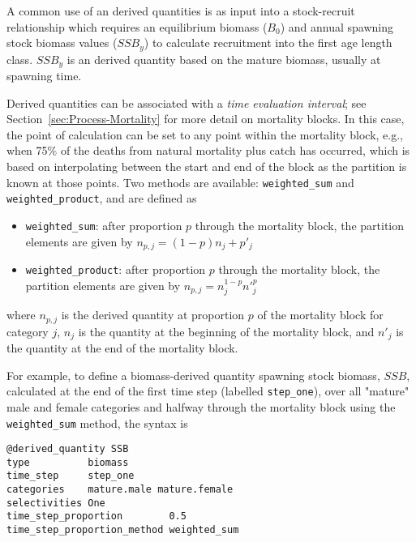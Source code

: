 A common use of an derived quantities is as input into a stock-recruit relationship  which requires an equilibrium biomass ($B_0$) and annual spawning stock biomass values ($SSB_y$) to calculate recruitment into the first \ifAgeBased age \else length \fi class. $SSB_y$ is an derived quantity based on the mature biomass, usually at spawning time.

Derived quantities can be associated with a \textit{time evaluation interval}; see Section~\ref{sec:Process-Mortality} for more detail on mortality blocks. In this case, the point of calculation can be set to any point within the mortality block, e.g., when 75\% of the deaths from natural mortality plus catch has occurred, which is based on interpolating between the start and end of the block as the partition is known at those points.  Two  methods are available: \texttt{weighted\_sum} and \texttt{weighted\_product}, and are defined as

\begin{itemize}
	\item \texttt{weighted\_sum}: after proportion $p$ through the mortality block, the partition elements are given by $n_{p,j} = (1 - p)n_j + p'_j$

	\item \texttt{weighted\_product}: after proportion $p$ through the mortality block, the partition elements are given by $n_{p,j} = n_j^{1-p} n'^p_j$
\end{itemize}

where $n_{p,j}$ is the derived quantity at proportion $p$ of the mortality block for category $j$, $n_j$ is the quantity at the beginning of the mortality block, and $n'_j$ is the quantity at the end of the mortality block.

For example, to define a biomass-derived quantity spawning stock biomass, $SSB$, calculated at the end of the first time step (labelled \texttt{step\_one}), over all "mature" male and female categories and halfway through the mortality block using the \texttt{weighted\_sum} method, the syntax is

{\small{\begin{verbatim}
@derived_quantity SSB
type          biomass
time_step     step_one
categories    mature.male mature.female
selectivities One
time_step_proportion        0.5
time_step_proportion_method weighted_sum
\end{verbatim}}}

\subsection{\label{sec:Growth}}

